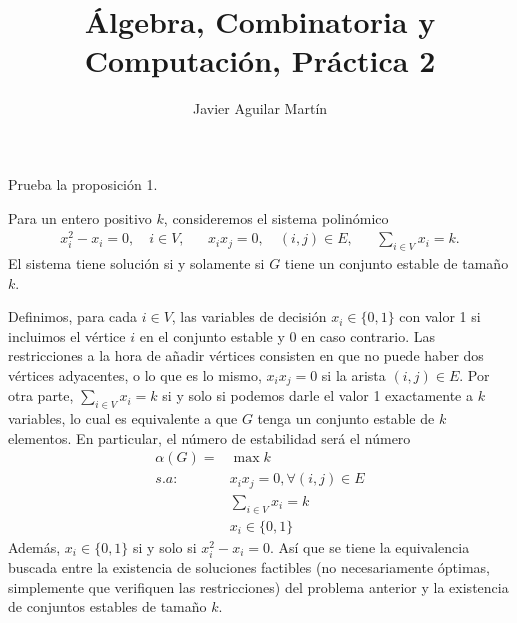 \documentclass[twoside]{article}
\begin{document}
\title{Álgebra, Combinatoria y Computación, Práctica 2}
\author{Javier Aguilar Martín}
\maketitle

\begin{ejercicio}{4}
Prueba la proposición 1.
\end{ejercicio}
\begin{prop}
Para un entero positivo $k$, consideremos el sistema polinómico
\begin{align*}
x_i^2-x_i=0,\quad i\in V,& & x_ix_j=0,\quad (i,j)\in E,& &\sum_{i\in V}x_i=k.
\end{align*}
El sistema tiene solución si y solamente si $G$ tiene un conjunto estable de tamaño $k$. 
\end{prop}
\begin{solucion}
Definimos, para cada $i\in V$, las variables de decisión $x_i\in\{0,1\}$ con valor 1 si incluimos el vértice $i$ en el conjunto estable y 0 en caso contrario. Las restricciones a la hora de añadir vértices consisten en que no puede haber dos vértices adyacentes, o lo que es lo mismo, $x_ix_j=0$ si la arista $(i,j)\in E$. Por otra parte, $\sum_{i\in V}x_i=k$ si y solo si podemos darle el valor 1 exactamente a $k$ variables, lo cual es equivalente a que $G$ tenga un conjunto estable de $k$ elementos. En particular, el número de estabilidad será el número 
\begin{align*}
\alpha(G)=&\max k\\
s.a:\ &x_ix_j=0, \forall (i,j)\in E\\
&\sum_{i\in V}x_i=k\\
&x_i\in \{0,1\}
\end{align*} 
Además, $x_i\in\{0,1\}$ si y solo si $x_i^2-x_i=0$. Así que se tiene la equivalencia buscada entre la existencia de soluciones factibles (no necesariamente óptimas, simplemente que verifiquen las restricciones) del problema anterior y la existencia de conjuntos estables de tamaño $k$.


\end{solucion}
\end{document}
